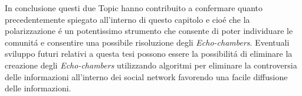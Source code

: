 In conclusione questi due Topic hanno contribuito a confermare quanto precedentemente spiegato all'interno di questo capitolo e cio\'e che la polarizzazione \'e un potentissimo strumento che consente di poter individuare le comunit\'a e consentire una possibile risoluzione degli \textit{Echo-chambers}. Eventuali sviluppo futuri relativi a questa tesi possono essere la possibilit\'a di eliminare la creazione degli \textit{Echo-chambers} utilizzando algoritmi per eliminare la controversia delle informazioni all'interno dei social network favorendo una facile diffusione delle informazioni. 
\begin{comment}
\section{Inquadramento generale}
La prima parte contiene una frase che spiega l'area generale dove si svolge il lavoro; una che spiega la sottoarea pi\`u specifica dove si svolge il lavoro e la terza, che dovrebbe cominciare con le seguenti parole ``lo scopo della tesi \`e \dots'', illustra l'obbiettivo del lavoro. Poi vi devono essere una o due frasi che contengano una breve spiegazione di cosa e come \`e stato fatto, delle attivit\`a� sperimentali, dei risultati ottenuti con una valutazione e degli sviluppi futuri. La prima parte deve essere circa una facciata e mezza o due

\section{Breve descrizione del lavoro}
La seconda parte deve essere una esplosione della prima e deve quindi mostrare in maniera pi\`u esplicita l'area dove si svolge il lavoro, le fonti bibliografiche pi\`u importanti su cui si fonda il lavoro in maniera sintetica (una pagina) evidenziando i lavori in letteratura che presentano attinenza con il lavoro affrontato in modo da mostrare da dove e perch\'e \`e sorta la tematica di studio. Poi si mostrano esplicitamente le realizzazioni, le direttive future di ricerca, quali sono i problemi aperti e quali quelli affrontati e si ripete lo scopo della tesi. Questa parte deve essere piena (ma non grondante come la sezione due) di citazioni bibliografiche e deve essere lunga circa 4 facciate.

\section{Struttura della tesi}
La terza parte contiene la descrizione della struttura della tesi ed \`e organizzata nel modo seguente.
``La tesi \`e strutturata nel modo seguente.


\end{comment}
